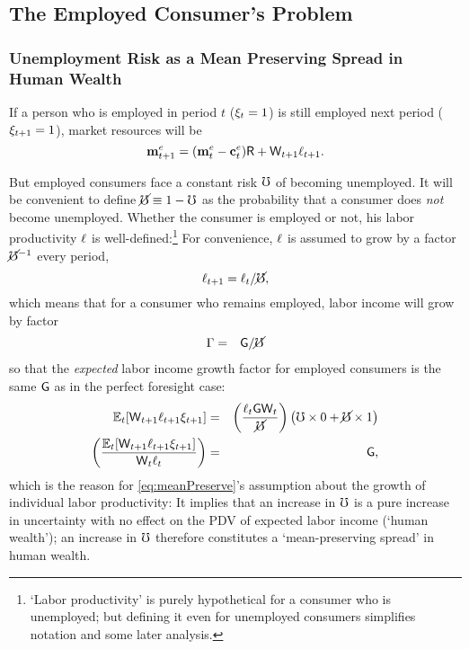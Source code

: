 \documentclass{handout}
\begin{document}
\subsection{The Employed Consumer's Problem}

\subsubsection{Unemployment Risk as a Mean Preserving Spread in Human Wealth} \label{subsubsec:uMPS}
If a person who is employed in period $t$ ($\xi_{t}=1$) is still employed next
period ($\xi_{t+1}=1$), market resources will be
\begin{equation}
\mathbf{m}^{e}_{t+1} = (\mathbf{m}^{e}_{t}-\mathbf{c}^{e}_{t})\mathsf{R}+\mathsf{W}_{t+1}\ell_{t+1}. \label{eq:Metp1}
\end{equation}

But employed consumers face a constant risk $\mho$ of becoming unemployed.  
It will be convenient to define $\cancel{\mho}\equiv 1-\mho$ as the probability that a consumer does {\it not} become unemployed.  Whether the consumer is employed or not, his labor productivity $\ell$ is well-defined:\footnote{`Labor productivity' is purely hypothetical for a consumer who is unemployed; but defining it even for unemployed consumers simplifies notation and some later analysis.}  For convenience, $\ell$ is assumed to grow by a factor $\cancel{\mho}^{-1}$ every period,
\begin{equation}
\ell_{t+1} =    \ell_{t}/\cancel{\mho} \label{eq:meanPreserve},
\end{equation}
which means that for a consumer who remains employed, labor income will grow by factor
\begin{eqnarray}
  \Gamma & = & \mathsf{G}/\cancel{\mho}
\end{eqnarray}
so that the {\it expected} labor income growth factor for
employed consumers is the same $\mathsf{G}$ as in the perfect foresight case:
\begin{eqnarray*}
  \operatorname{\mathbb{E}}_{t}[\mathsf{W}_{t+1}\ell_{t+1}\xi_{t+1}] & = &  \left(\frac{\ell_{t} \mathsf{G} \mathsf{W}_{t}}{\cancel{\mho}}\right)\left(\mho \times 0 + \cancel{\mho} \times 1 \right)
\\ \left(\frac{\operatorname{\mathbb{E}}_{t}[\mathsf{W}_{t+1}\ell_{t+1}\xi_{t+1}]}{\mathsf{W}_{t} \ell_{t}}\right) &  = & \mathsf{G}
,
\end{eqnarray*}
which is  the reason for \eqref{eq:meanPreserve}'s assumption about the growth of
individual labor productivity: It implies
that an increase in $\mho$ is a pure increase in uncertainty with no
effect on the PDV of expected labor income (`human wealth'); an increase in $\mho$ therefore constitutes a `mean-preserving spread' in human wealth.
\end{document}
